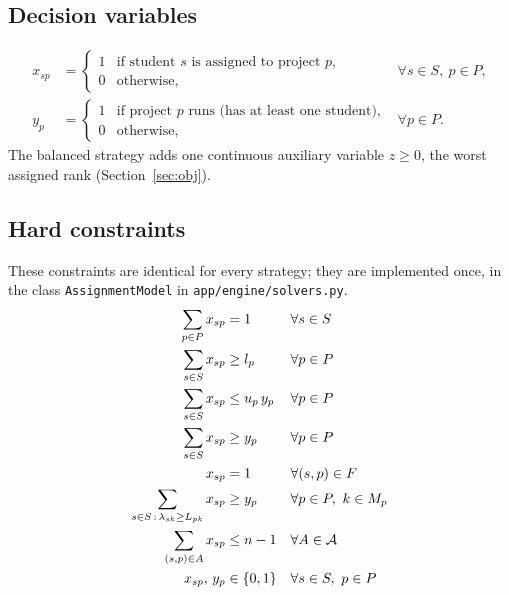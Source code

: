 \documentclass[11pt,a4paper]{article}
\newcommand{\code}[1]{\texttt{#1}}
\begin{document}
\subsection{Decision variables}
\begin{align*}
  x_{sp} &= \begin{cases} 1 & \text{if student $s$ is assigned to project $p$,}\\
                           0 & \text{otherwise,} \end{cases}
  & \forall s \in S,\ p \in P,\\[4pt]
  y_p &= \begin{cases} 1 & \text{if project $p$ runs (has at least one student),}\\
                        0 & \text{otherwise,} \end{cases}
  & \forall p \in P.
\end{align*}
The balanced strategy adds one continuous auxiliary variable $z \ge 0$, the
worst assigned rank (Section~\ref{sec:obj}).

\subsection{Hard constraints}

These constraints are identical for every strategy; they are implemented once,
in the class \code{AssignmentModel} in \code{app/engine/solvers.py}.
\begin{align}
  \sum_{p \in P} x_{sp} &= 1 && \forall s \in S
    \label{eq:one}\\
  \sum_{s \in S} x_{sp} &\ge l_p && \forall p \in P
    \label{eq:min}\\
  \sum_{s \in S} x_{sp} &\le u_p \, y_p && \forall p \in P
    \label{eq:max}\\
  \sum_{s \in S} x_{sp} &\ge y_p && \forall p \in P
    \label{eq:runs}\\
  x_{sp} &= 1 && \forall (s,p) \in F
    \label{eq:fixed}\\
  \sum_{s \in S \,:\, \lambda_{sk} \ge L_{pk}} x_{sp} &\ge y_p
    && \forall p \in P,\ k \in M_p
    \label{eq:mand}\\
  \sum_{(s,p) \in A} x_{sp} &\le n - 1 && \forall A \in \mathcal{A}
    \label{eq:nogood}\\
  x_{sp},\, y_p &\in \{0,1\} && \forall s \in S,\ p \in P \notag
\end{align}
\end{document}
